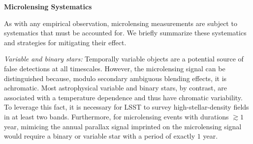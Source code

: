 

\noindent \textbf{Microlensing Systematics}

As with any empirical observation, microlensing measurements are subject to systematics that must be accounted for.
We briefly summarize these systematics and strategies for mitigating their effect.

\emph{Variable and binary stars:} Temporally variable objects are a potential source of false detections at all timescales. However, the microlensing signal can be distinguished because, modulo secondary ambiguous blending effects, it is achromatic. Most astrophysical variable and binary stars, by contrast, are associated with a temperature dependence and thus have chromatic variability. To leverage this fact, it is necessary for LSST to survey high-stellar-density fields in at least two bands. Furthermore, for microlensing events with durations $\gtrsim 1$ year, mimicing the annual parallax signal imprinted on the microlensing signal would require a binary or variable star with a period of exactly $1$ year.


